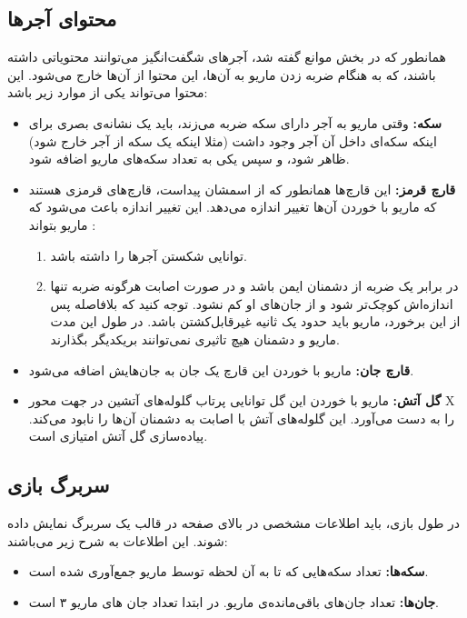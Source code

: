 \documentclass{utap}
\begin{document}
	\subsection{محتوای آجرها}
همانطور که در بخش موانع گفته شد، آجر‌های شگفت‌انگیز می‌توانند محتویاتی داشته باشند، که به هنگام ضربه زدن ماریو به آن‌ها، این محتوا از آن‌ها خارج می‌شود. این محتوا می‌تواند یکی از موارد زیر باشد:
	\begin{itemize}
		\item
\textbf{سکه:}
وقتی ماریو به آجر دارای سکه ضربه می‌زند، باید یک نشانه‌ی بصری برای اینکه سکه‌ای داخل آن آجر وجود داشت (مثلا اینکه یک سکه از آجر خارج شود) ظاهر شود، و سپس یکی به تعداد سکه‌های ماریو اضافه شود.
		\item
\textbf{قارچ قرمز:‌}
این قارچ‌ها همانطور که از اسمشان پیداست، قارچ‌های قرمزی هستند که ماریو با خوردن آن‌ها تغییر اندازه می‌دهد. این تغییر اندازه باعث می‌شود که ماریو بتواند :
		\begin{enumerate}
			\item
توانایی شکستن آجر‌ها را داشته باشد.
			\item
در برابر یک ضربه از دشمنان ایمن باشد و در صورت اصابت هرگونه ضربه تنها اندازه‌اش کوچک‌تر شود و از جان‌های او کم نشود. توجه کنید که بلافاصله پس از این برخورد، ماریو باید حدود یک ثانیه غیرقابل‌کشتن باشد. در طول این مدت ماریو و دشمنان هیچ تاثیری نمی‌توانند بر‌یکدیگر بگذارند.
		\end{enumerate}

		\item
\textbf{قارچ جان:‌}
ماریو با خوردن این قارچ یک جان به جان‌هایش اضافه می‌شود.
		\item
\textbf{گل آتش:}
ماریو با خوردن این گل توانایی پرتاب گلوله‌های آتشین در جهت محور X را به دست می‌آورد. این گلوله‌های آتش با اصابت به دشمنان آن‌ها را نابود می‌کند. پیاده‌سازی گل آتش امتیازی است.
	\end{itemize}

	\subsection{سربرگ‌ بازی}
در طول بازی، باید اطلاعات مشخصی در بالای صفحه در قالب یک سربرگ نمایش داده شوند. این اطلاعات به شرح زیر می‌باشند:
	\begin{itemize}
		\item
\textbf{سکه‌ها:}
تعداد سکه‌هایی که تا به آن لحظه توسط ماریو جمع‌آوری شده است.
		\item
\textbf{جان‌ها:}
تعداد جان‌های باقی‌مانده‌ی ماریو. در ابتدا تعداد جان های ماریو  ۳ است.
	\end{itemize}
\end{document}
